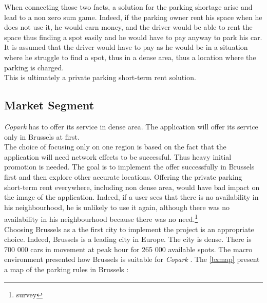 \documentclass[12pt,a4paper,oneside]{book}
\newcommand{\bp}{\textit{Copark }}
\begin{document}
When connecting those two facts, a solution for the parking shortage arise and lead to a non zero sum game. Indeed, if the parking owner rent his space when he does not use it, he would earn money, and the driver would be able to rent the space thus finding a spot easily and he would have to pay anyway to park his car. It is assumed that the driver would have to pay as he would be in a situation where he struggle to find a spot, thus in a dense area, thus a location where the parking is charged.\\

This is ultimately a private parking short-term rent solution.

\subsection{Market Segment}
\bp has to offer its service in dense area. The application will offer its service only in Brussels at first.\\

The choice of focusing only on one region is based on the fact that the application will need network effects to be successful. Thus heavy initial promotion is needed. The goal is to implement the offer successfully in Brussels first and then explore other accurate locations. Offering the private parking short-term rent everywhere, including non dense area, would have bad impact on the image of the application. Indeed, if a user sees that there is no availability in his neighbourhood, he is unlikely to use it again, although there was no availability in his neighbourhood because there was no need.\footnote{survey} \\

Choosing Brussels as a the first city to implement the project is an appropriate choice. Indeed, Brussels is a leading city in Europe. The city is dense. There is 700 000 cars in movement at peak hour for 265 000 available spots.\cite{parkbx} The macro environment presented how Brussels is suitable for \bp. The \autoref{bxmap} present a map of the parking rules in Brussels\cite{parkbx} : \\
\end{document}
